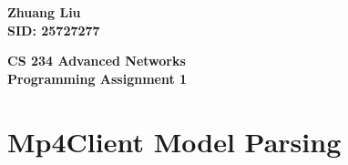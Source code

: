\documentclass{article}%
\begin{document}
\begin{flushright}
\begin{LARGE}

\textbf{Zhuang Liu \\
SID: 25727277}
\end{LARGE}
\end{flushright}

\begin{center}
\begin{huge}
\textbf{CS 234 Advanced Networks \\
Programming Assignment 1} \\
\end{huge}
\end{center}

\section{Mp4Client Model Parsing}
\end{document}
